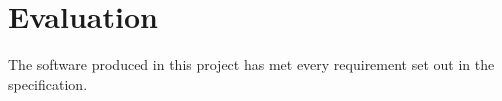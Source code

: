 \chapter{Evaluation}

The software produced in this project has met every requirement set out in the
specification.
